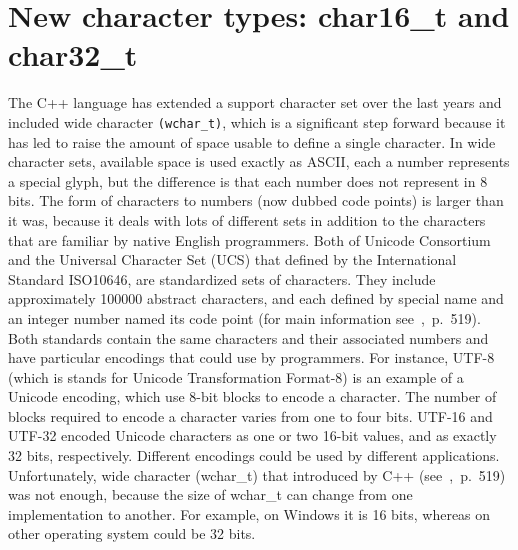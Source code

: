 \documentclass[11pt]{report}
\begin{document}
\section{New character types: char16\_t and char32\_t}
\label{section: char16_t and char32_t}
The C++ language has extended a support character set over the last years and included wide character \texttt{(wchar\_t)}, which is a significant step forward because it has led to raise the amount of space usable to define a single character. In wide character sets, available space is used exactly as ASCII, each a number represents a special glyph, but the difference is that each number does not represent in 8 bits. The form of characters to numbers (now dubbed code points) is larger than it was, because it deals with lots of different sets in addition to the characters that are familiar by native English programmers. Both of Unicode Consortium and the Universal Character Set (UCS) that defined by the International Standard ISO10646, are standardized sets of characters. They include approximately 100000 abstract characters, and each defined by special name and an integer number named its code point (for main information see~\cite{Gregorie:professionalcpp},~p.~519). Both standards contain the same characters and their associated numbers and have particular encodings that could use by programmers. For instance, UTF-8 (which is stands for Unicode Transformation Format-8) is an example of a Unicode encoding, which use 8-bit blocks to encode a character. The number of blocks required to encode a character varies from one to four bits. UTF-16 and UTF-32 encoded Unicode characters as one or two 16-bit values, and as exactly 32 bits, respectively. Different encodings could be used by different applications. Unfortunately, wide character (wchar\_t) that introduced by C++ (see~\cite{Gregorie:professionalcpp},~p.~519) was not enough, because the size of wchar\_t can change from one implementation to another. For example, on Windows it is 16 bits, whereas on other operating system could be 32 bits.
\end{document}
